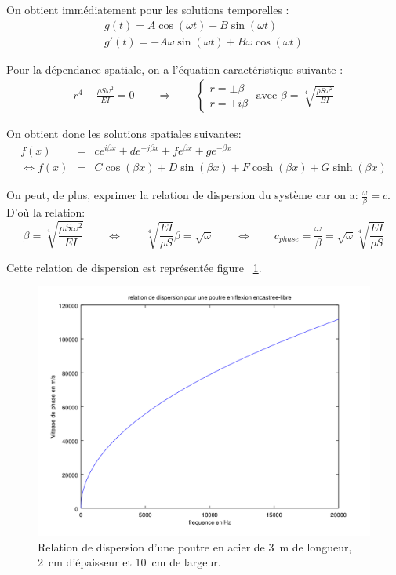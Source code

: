 \documentclass[a4paper,11pt]{report} %
\begin{document}
On obtient immédiatement pour les solutions temporelles :
\begin{eqnarray*}
g(t) = A \cos(\omega t) + B \sin(\omega t) \\
g'(t) = -A\omega \sin(\omega t) + B\omega \cos(\omega t)
\end{eqnarray*}

Pour la dépendance spatiale, on a l'équation caractéristique suivante :
\begin{eqnarray*}
r^4 - \frac{ \rho S \omega^2}{EI} = 0
\qquad \Rightarrow \qquad\begin{cases} r = \pm \beta  \\ r = \pm i\beta \end{cases} \text{ avec } \beta = \sqrt[4]{\frac{\rho S \omega^2}{EI}}
\end{eqnarray*}

On obtient donc les solutions spatiales suivantes:
\begin{eqnarray*}
f(x) & = & c e^{i\beta x} + d e^{-j\beta x} + f e^{\beta x} + g e^{-\beta x} \\
\Leftrightarrow f(x) & = & C \cos(\beta x) + D \sin(\beta x) + F \cosh(\beta x) + G \sinh(\beta x)
\end{eqnarray*}

On peut, de plus, exprimer la relation de dispersion du système car on a: $ \frac{\omega}{\beta}=c$. D’où la relation:
\begin{equation}
\beta = \sqrt[4]{\frac{\rho S \omega^2}{EI}} \qquad \Leftrightarrow \qquad \sqrt[4]{\frac{EI}{\rho S}} \beta = \sqrt{\omega} \qquad \Leftrightarrow \qquad c_{phase} = \frac{\omega}{\beta} = \sqrt{\omega} \sqrt[4]{\frac{EI}{\rho S}}
\end{equation}

Cette relation de dispersion est représentée figure ~\ref{poutre_graphic2}.

\begin{figure}[h!]
\centering \includegraphics[scale = 0.6]{./figures/poutre_dispersion.png}
\caption{Relation de dispersion d'une poutre en acier de 3~m de longueur, 2~cm d'épaisseur et 10~cm de largeur.   } \label{poutre_graphic2}
\end{figure}
\end{document}
